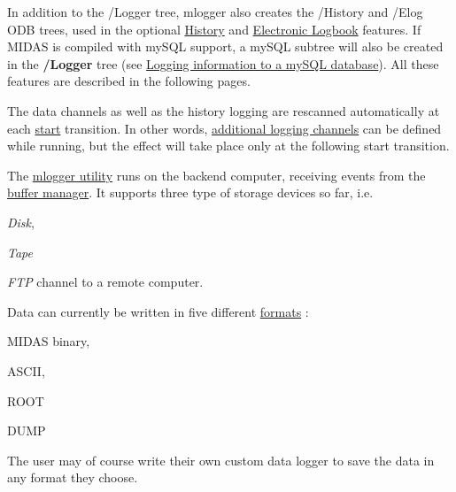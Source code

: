 \par
 In addition to the /Logger tree, mlogger also creates the /History and /Elog ODB trees, used in the optional \hyperlink{F_History_logging}{History} and \hyperlink{F_Elog}{Electronic Logbook} features. If MIDAS is compiled with mySQL support, a mySQL subtree will also be created in the {\bfseries /Logger} tree (see \hyperlink{F_mySQL}{Logging information to a mySQL database}). All these features are described in the following pages.

 The data channels as well as the history logging are rescanned automatically at each \hyperlink{RC_Run_States_and_Transitions}{start} transition.  In other words, \hyperlink{F_Logging_Data_F_Logger_Channels}{additional logging channels} can be defined while running, but the effect will take place only at the following start transition. \par
 \label{F_Logging_idx_FTP_channel_mlogger}
\hypertarget{F_Logging_idx_FTP_channel_mlogger}{}
 The \hyperlink{F_Logging_F_mlogger_utility}{mlogger utility} runs on the backend computer, receiving events from the \hyperlink{F_MainElements_F_Buffer_Manager_overview}{buffer manager}. It supports three type of storage devices so far, i.e.
\begin{DoxyItemize}
\item {\itshape Disk\/},
\item {\itshape Tape\/} 
\item {\itshape FTP\/} channel to a remote computer.
\end{DoxyItemize}

Data can currently be written in five different \hyperlink{F_Logging_Data_F_Logger_CS_Format}{formats} :
\begin{DoxyItemize}
\item MIDAS binary,
\item ASCII,
\item ROOT
\item DUMP
\end{DoxyItemize}

The user may of course write their own custom data logger to save the data in any format they choose. \par
 \par


